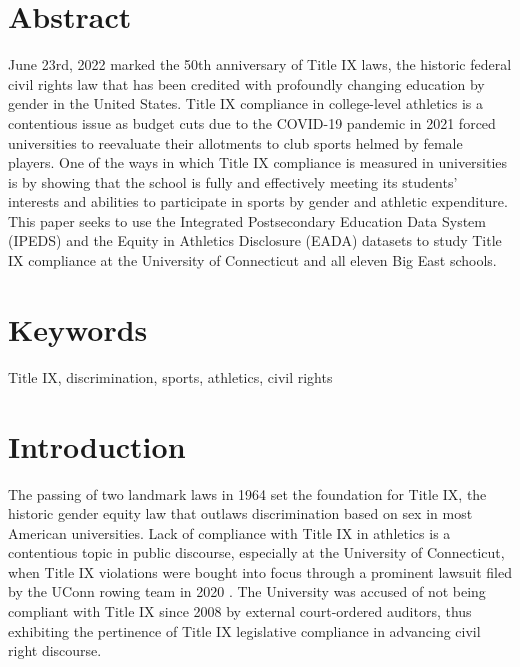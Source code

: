 \documentclass[11pt]{article}
\title{\vspace{-3cm}{\textbf{Title IX Compliance and Equity in Athletics\\{STAT 3493W}}}}
\author{Nidhi Jayakumar Nair}
\begin{document}
       
\maketitle

\section{Abstract}

June 23rd, 2022 marked the 50th anniversary of Title IX laws, the historic federal civil rights law that has been credited with profoundly changing education by gender in the United States. Title IX compliance in college-level athletics is a contentious issue as budget cuts due to the COVID-19 pandemic in 2021 forced universities to reevaluate their allotments to club sports helmed by female players. One of the ways in which Title IX compliance is measured in universities is by showing that the school is fully and effectively meeting its students' interests and abilities to participate in sports by gender and athletic expenditure. This paper seeks to use the Integrated Postsecondary Education Data System (IPEDS) and the Equity in Athletics Disclosure (EADA) datasets to study Title IX compliance at the University of Connecticut and all eleven Big East schools.

\section{Keywords}
Title IX, discrimination, sports, athletics, civil rights

\section{Introduction}

The passing of two landmark laws in 1964 set the foundation for Title IX, the historic gender equity law that outlaws discrimination based on sex in most American universities. Lack of compliance with Title IX in athletics is a contentious topic in public discourse, especially at the University of Connecticut, when Title IX violations were bought into focus through a prominent lawsuit filed by the UConn rowing team in 2020 \cite{Doyle}. The University was accused of not being compliant with Title IX since 2008 by external court-ordered auditors, thus exhibiting the pertinence of Title IX legislative compliance in advancing civil right discourse.

\medskip
\end{document}
